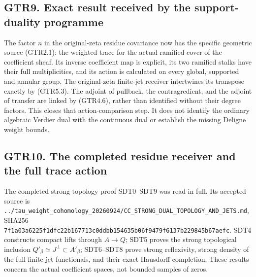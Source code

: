 \subsection{GTR9. Exact result received by the support-duality
programme}\label{gtr9.-exact-result-received-by-the-support-duality-programme}

The factor \(n\) in the original-zeta residue covariance now has the
specific geometric source (GTR2.1): the weighted trace for the actual
ramified cover of the coefficient sheaf. Its inverse coefficient map is
explicit, its two ramified stalks have their full multiplicities, and
its action is calculated on every global, supported and annular group.
The original-zeta finite-jet receiver intertwines its transpose exactly
by (GTR5.3). The adjoint of pullback, the contragredient, and the
adjoint of transfer are linked by (GTR4.6), rather than identified
without their degree factors. This closes that action-comparison step.
It does not identify the ordinary algebraic Verdier dual with the
continuous dual or establish the missing Deligne weight bounds.

\subsection{GTR10. The completed residue receiver and the full trace
action}\label{gtr10.-the-completed-residue-receiver-and-the-full-trace-action}

The completed strong-topology proof SDT0--SDT9 was read in full. Its
accepted source is
\nolinkurl{../tau_weight_cohomology_20260924/CC_STRONG_DUAL_TOPOLOGY_AND_JETS.md},
SHA256
\nolinkurl{7f1a03a6225f1dfc22b167713c0ddbb154635b06f9479f6137b229845b67aefc}.
SDT4 constructs compact lifts through \(A\to Q\); SDT5 proves the strong
topological inclusion \(Q'_\beta\simeq J^\perp\subset A'_\beta\);
SDT6--SDT8 prove strong reflexivity, strong density of the full
finite-jet functionals, and their exact Hausdorff completion. These
results concern the actual coefficient spaces, not bounded samples of
zeros.

